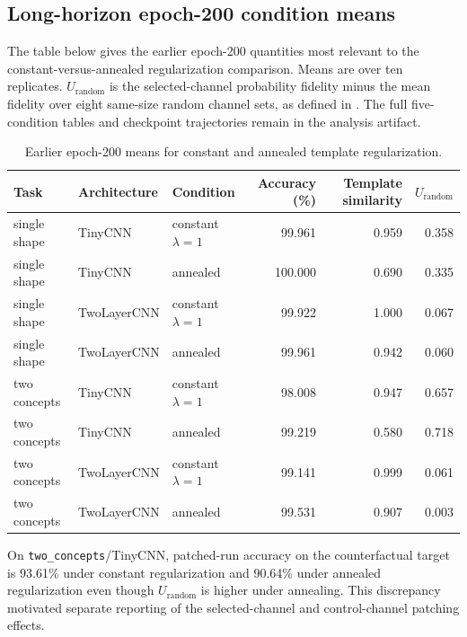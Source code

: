\subsection{Long-horizon epoch-200 condition means}\label{app:development-endpoints}

The table below gives the earlier epoch-200 quantities most relevant to the constant-versus-annealed regularization comparison. Means are over ten replicates. $U_{\mathrm{random}}$ is the selected-channel probability fidelity minus the mean fidelity over eight same-size random channel sets, as defined in . The full five-condition tables and checkpoint trajectories remain in the analysis artifact.

\begin{table}[h]
\caption{Earlier epoch-200 means for constant and annealed template regularization.}
\label{tab:development-endpoints}
\centering
\footnotesize
\setlength{\tabcolsep}{3pt}
\begin{tabular}{lllrrr}
\toprule
Task & Architecture & Condition & Accuracy (\%) & Template similarity & $U_{\mathrm{random}}$ \\
\midrule
single shape & TinyCNN & constant $\lambda=1$ & 99.961 & 0.959 & 0.358 \\
single shape & TinyCNN & annealed & 100.000 & 0.690 & 0.335 \\
\addlinespace[2pt]
single shape & TwoLayerCNN & constant $\lambda=1$ & 99.922 & 1.000 & 0.067 \\
single shape & TwoLayerCNN & annealed & 99.961 & 0.942 & 0.060 \\
\addlinespace[2pt]
two concepts & TinyCNN & constant $\lambda=1$ & 98.008 & 0.947 & 0.657 \\
two concepts & TinyCNN & annealed & 99.219 & 0.580 & 0.718 \\
\addlinespace[2pt]
two concepts & TwoLayerCNN & constant $\lambda=1$ & 99.141 & 0.999 & 0.061 \\
two concepts & TwoLayerCNN & annealed & 99.531 & 0.907 & 0.003 \\
\bottomrule
\end{tabular}
\end{table}

On \texttt{two\_concepts}/TinyCNN, patched-run accuracy on the counterfactual target is 93.61\% under constant regularization and 90.64\% under annealed regularization even though $U_{\mathrm{random}}$ is higher under annealing. This discrepancy motivated separate reporting of the selected-channel and control-channel patching effects.

